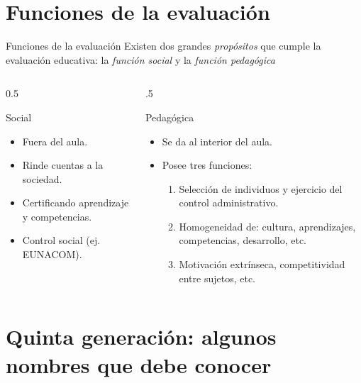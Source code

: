 \documentclass[11pt, aspectratio=169, xcolor=table,hyphens]{beamer}
\begin{document}
\section{Funciones de la evaluación}

\begin{frame}{Funciones de la evaluación}
	Existen dos grandes \textit{propósitos} que cumple la evaluación educativa: la \textit{función social} y la \textit{función pedagógica}

	\begin{columns}
		\begin{column}{0.5\textwidth}
			\begin{block}{Social}
				\begin{itemize}[<+->]
					\item Fuera del aula.
					\item Rinde cuentas a la sociedad.
					\item Certificando aprendizaje y competencias.
					\item Control social (ej. EUNACOM).
				\end{itemize}
			\end{block}
		\end{column}
		\begin{column}{.5\textwidth}
			\begin{block}{Pedagógica}
				\begin{itemize}
					\item<5-> Se da al interior del aula.
					\item<6-> Posee tres funciones:
					      \begin{enumerate}
						      \item<7-> Selección de individuos y ejercicio del control administrativo.
						      \item<8-> Homogeneidad de: cultura, aprendizajes, competencias, desarrollo, etc.
						      \item<9-> Motivación extrínseca, competitividad entre sujetos, etc.
					      \end{enumerate}
				\end{itemize}
			\end{block}
		\end{column}
	\end{columns}
\end{frame}

\section{Quinta generación: algunos nombres que debe conocer}
\end{document}
